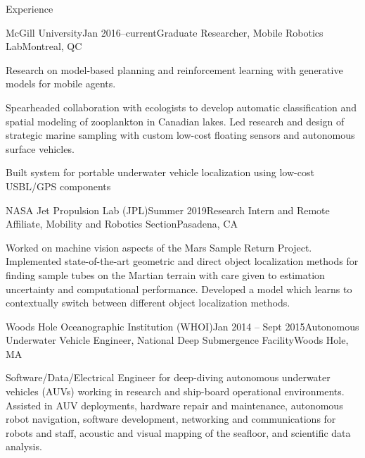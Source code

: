 \documentclass{resume} %
\begin{document}
\begin{rSection}{Experience}
\begin{rSubsection}{McGill University}{Jan 2016--current}{Graduate Researcher, Mobile Robotics Lab}{Montreal, QC}
\item{Research on model-based planning and reinforcement learning with generative models for mobile agents.}
\item{Spearheaded collaboration with ecologists to develop automatic classification and spatial modeling of zooplankton in Canadian lakes. Led research and design of strategic marine sampling with custom low-cost floating sensors and autonomous surface vehicles.}
\item{Built system for portable underwater vehicle localization using low-cost USBL/GPS components} 
\end{rSubsection}
	\vspace{-.2cm}
\begin{rSubsection}{NASA Jet Propulsion Lab (JPL)}{Summer 2019}{Research Intern and Remote Affiliate, Mobility and Robotics Section}{Pasadena, CA}
\item{Worked on machine vision aspects of the Mars Sample Return Project. Implemented state-of-the-art geometric and direct object localization methods for finding sample tubes on the Martian terrain with care given to estimation uncertainty and computational performance. Developed a model which learns to contextually switch between different object localization methods.}
\end{rSubsection}
	\vspace{-.2cm}
\begin{rSubsection}{Woods Hole Oceanographic Institution (WHOI)}{Jan 2014 -- Sept 2015}{Autonomous Underwater Vehicle Engineer, National Deep Submergence Facility}{Woods Hole, MA}
\item{Software/Data/Electrical Engineer for deep-diving autonomous underwater vehicles (AUVs) working in research and ship-board operational environments. Assisted in AUV deployments, hardware repair and maintenance, autonomous robot navigation, software development, networking and communications for robots and staff, acoustic and visual mapping of the seafloor, and scientific data analysis.}

\end{rSubsection}
\end{rSection}
\end{document}
